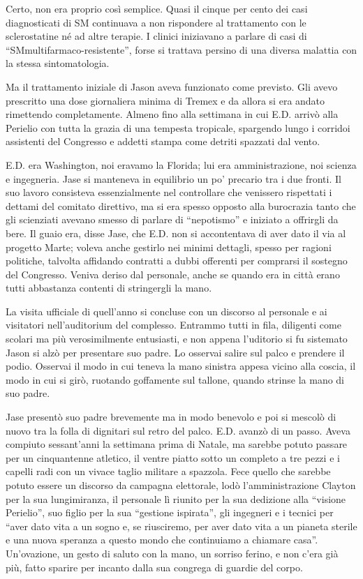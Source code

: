 Certo, non era proprio così semplice. Quasi il cinque per cento dei casi
diagnosticati di SM continuava a non rispondere al trattamento con le
sclerostatine né ad altre terapie. I clinici iniziavano a parlare di
casi di ``SMmultifarmaco-resistente'', forse si trattava persino di una
diversa malattia con la stessa sintomatologia.

Ma il trattamento iniziale di Jason aveva funzionato come previsto. Gli
avevo prescritto una dose giornaliera minima di Tremex e da allora si
era andato rimettendo completamente. Almeno fino alla settimana in cui
E.D. arrivò alla Perielio con tutta la grazia di una tempesta tropicale,
spargendo lungo i corridoi assistenti del Congresso e addetti stampa
come detriti spazzati dal vento.

E.D. era Washington, noi eravamo la Florida; lui era amministrazione,
noi scienza e ingegneria. Jase si manteneva in equilibrio un po'
precario tra i due fronti. Il suo lavoro consisteva essenzialmente nel
controllare che venissero rispettati i dettami del comitato direttivo,
ma si era spesso opposto alla burocrazia tanto che gli scienziati
avevano smesso di parlare di ``nepotismo'' e iniziato a offrirgli da
bere. Il guaio era, disse Jase, che E.D. non si accontentava di aver
dato il via al progetto Marte; voleva anche gestirlo nei minimi
dettagli, spesso per ragioni politiche, talvolta affidando contratti a
dubbi offerenti per comprarsi il sostegno del Congresso. Veniva deriso
dal personale, anche se quando era in città erano tutti abbastanza
contenti di stringergli la mano.

La visita ufficiale di quell'anno si concluse con un discorso al
personale e ai visitatori nell'auditorium del complesso. Entrammo tutti
in fila, diligenti come scolari ma più verosimilmente entusiasti, e non
appena l'uditorio si fu sistemato Jason si alzò per presentare suo
padre. Lo osservai salire sul palco e prendere il podio. Osservai il
modo in cui teneva la mano sinistra appesa vicino alla coscia, il modo
in cui si girò, ruotando goffamente sul tallone, quando strinse la mano
di suo padre.

Jase presentò suo padre brevemente ma in modo benevolo e poi si mescolò
di nuovo tra la folla di dignitari sul retro del palco. E.D. avanzò di
un passo. Aveva compiuto sessant'anni la settimana prima di Natale, ma
sarebbe potuto passare per un cinquantenne atletico, il ventre piatto
sotto un completo a tre pezzi e i capelli radi con un vivace taglio
militare a spazzola. Fece quello che sarebbe potuto essere un discorso
da campagna elettorale, lodò l'amministrazione Clayton per la sua
lungimiranza, il personale lì riunito per la sua dedizione alla
``visione Perielio'', suo figlio per la sua ``gestione ispirata'', gli
ingegneri e i tecnici per ``aver dato vita a un sogno e, se riusciremo,
per aver dato vita a un pianeta sterile e una nuova speranza a questo
mondo che continuiamo a chiamare casa''. Un'ovazione, un gesto di saluto
con la mano, un sorriso ferino, e non c'era già più, fatto sparire per
incanto dalla sua congrega di guardie del corpo.

